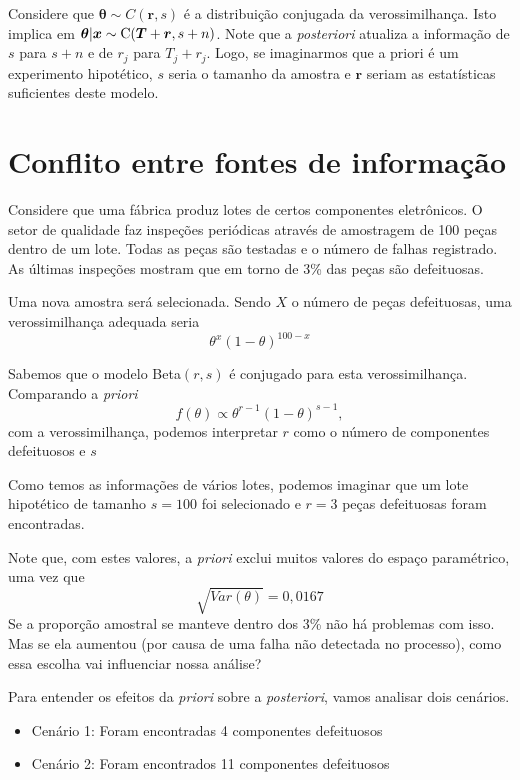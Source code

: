 \documentclass[
  letterpaper,
  DIV=11,
  numbers=noendperiod]{scrreprt}
\providecommand{\tightlist}{%
  \setlength{\itemsep}{0pt}\setlength{\parskip}{0pt}}\usepackage{longtable,booktabs,array}
\theoremstyle{definition}
\theoremstyle{definition}
\theoremstyle{remark}
\begin{document}
Considere que \(\boldsymbol{\theta}\sim C(\boldsymbol{r},s)\) é a
distribuição conjugada da verossimilhança. Isto implica em
\(\boldsymbol{\theta}|\boldsymbol{x}\sim\hbox{C}(\boldsymbol{T}+\boldsymbol{r},s+n)\).
Note que a \emph{posteriori} atualiza a informação de \(s\) para \(s+n\)
e de \(r_j\) para \(T_j+r_j\). Logo, se imaginarmos que a priori é um
experimento hipotético, \(s\) seria o tamanho da amostra e
\(\boldsymbol{r}\) seriam as estatísticas suficientes deste modelo.

\hypertarget{conflito-entre-fontes-de-informauxe7uxe3o}{%
\section{Conflito entre fontes de
informação}\label{conflito-entre-fontes-de-informauxe7uxe3o}}

Considere que uma fábrica produz lotes de certos componentes
eletrônicos. O setor de qualidade faz inspeções periódicas através de
amostragem de 100 peças dentro de um lote. Todas as peças são testadas e
o número de falhas registrado. As últimas inspeções mostram que em torno
de 3\% das peças são defeituosas.

Uma nova amostra será selecionada. Sendo \(X\) o número de peças
defeituosas, uma verossimilhança adequada seria
\[\theta^x(1-\theta)^{100-x}\]

Sabemos que o modelo Beta\((r,s)\) é conjugado para esta
verossimilhança. Comparando a \emph{priori}
\[f(\theta)\varpropto \theta^{r-1}(1-\theta)^{s-1},\] com a
verossimilhança, podemos interpretar \(r\) como o número de componentes
defeituosos e \(s\)

Como temos as informações de vários lotes, podemos imaginar que um lote
hipotético de tamanho \(s=100\) foi selecionado e \(r=3\) peças
defeituosas foram encontradas.

Note que, com estes valores, a \emph{priori} exclui muitos valores do
espaço paramétrico, uma vez que \[\sqrt{Var(\theta)}=0,0167\] Se a
proporção amostral se manteve dentro dos 3\% não há problemas com isso.
Mas se ela aumentou (por causa de uma falha não detectada no processo),
como essa escolha vai influenciar nossa análise?

Para entender os efeitos da \emph{priori} sobre a \emph{posteriori},
vamos analisar dois cenários.

\begin{itemize}
\tightlist
\item
  Cenário 1: Foram encontradas 4 componentes defeituosos
\item
  Cenário 2: Foram encontrados 11 componentes defeituosos
\end{itemize}
\end{document}
